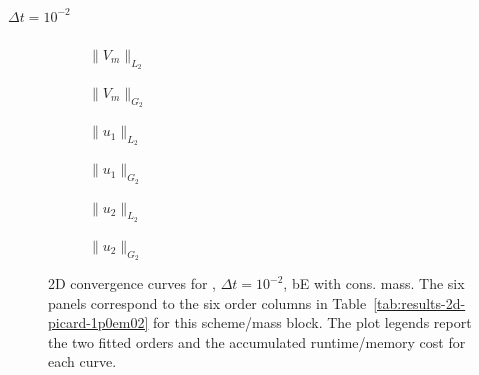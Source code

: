 \paragraph{$\Delta t=10^{-2}$}

\begin{figure}[p]
\centering
\begin{subfigure}{0.485\linewidth}
\centering
{}
\caption{$\|V_m\|_{L_2}$}
\label{fig:results-2d-picard-1p0em02-backwardeuler-consistent-a}
\end{subfigure}
\hfill
\begin{subfigure}{0.485\linewidth}
\centering
{}
\caption{$\|V_m\|_{G_2}$}
\label{fig:results-2d-picard-1p0em02-backwardeuler-consistent-b}
\end{subfigure}
\par\vspace{0.8em}
\begin{subfigure}{0.485\linewidth}
\centering
{}
\caption{$\|u_1\|_{L_2}$}
\label{fig:results-2d-picard-1p0em02-backwardeuler-consistent-c}
\end{subfigure}
\hfill
\begin{subfigure}{0.485\linewidth}
\centering
{}
\caption{$\|u_1\|_{G_2}$}
\label{fig:results-2d-picard-1p0em02-backwardeuler-consistent-d}
\end{subfigure}
\par\vspace{0.8em}
\begin{subfigure}{0.485\linewidth}
\centering
{}
\caption{$\|u_2\|_{L_2}$}
\label{fig:results-2d-picard-1p0em02-backwardeuler-consistent-e}
\end{subfigure}
\hfill
\begin{subfigure}{0.485\linewidth}
\centering
{}
\caption{$\|u_2\|_{G_2}$}
\label{fig:results-2d-picard-1p0em02-backwardeuler-consistent-f}
\end{subfigure}
\caption{2D convergence curves for , $\Delta t=10^{-2}$, bE with cons. mass. The six panels correspond to the six order columns in Table~\ref{tab:results-2d-picard-1p0em02} for this scheme/mass block. The plot legends report the two fitted orders and the accumulated runtime/memory cost for each curve.}
\label{fig:results-2d-picard-1p0em02-backwardeuler-consistent}
\end{figure}
\FloatBarrier

